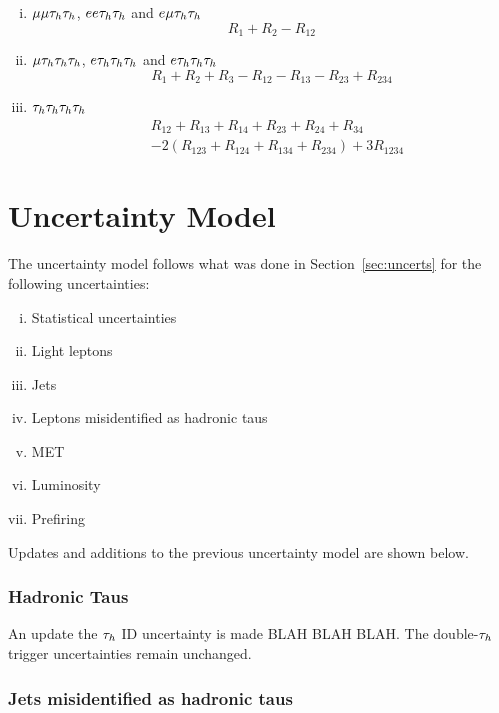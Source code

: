 \begin{enumerate}[i)]
\item $\mu\mu\tau_{h}\tau_{h}$, $ee\tau_{h}\tau_{h}$ and $e\mu\tau_{h}\tau_{h}$
\begin{equation}
R_1 + R_2 - R_{12}
\end{equation}

\item $\mu\tau_{h}\tau_{h}\tau_{h}$, $e\tau_{h}\tau_{h}\tau_{h}$ and $e\tau_{h}\tau_{h}\tau_{h}$
\begin{equation}
R_1 + R_2 + R_3 - R_{12} - R_{13} - R_{23} + R_{234}
\end{equation}

\item $\tau_{h}\tau_{h}\tau_{h}\tau_{h}$
\begin{align}
&R_{12} + R_{13} + R_{14} + R_{23} + R_{24} + R_{34} \\
&- 2(R_{123} + R_{124} + R_{134} + R_{234}) + 3R_{1234}
\end{align}
\end{enumerate}
 
\section{Uncertainty Model}

The uncertainty model follows what was done in Section~\ref{sec:uncerts} for the following uncertainties:
\begin{enumerate}[i)]
	\item Statistical uncertainties
	\item Light leptons
	\item Jets 
	\item Leptons misidentified as hadronic taus
	\item MET
	\item Luminosity
	\item Prefiring
\end{enumerate}
Updates and additions to the previous uncertainty model are shown below. \\

\subsubsection{Hadronic Taus}
An update the $\tau_{h}$ ID uncertainty is made BLAH BLAH BLAH.
The double-$\tau_{h}$ trigger uncertainties remain unchanged. \\

\subsubsection{Jets misidentified as hadronic taus}

